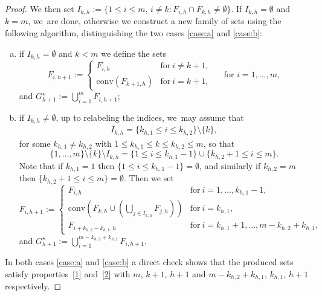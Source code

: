 \documentclass[JEP,XML,SOM,Unicode, NoFloatCountersInSection,published]{cedram}
\theoremstyle{definition}
\begin{document}
\begin{proof}
We then set $I_{k,h}:=\{1\le i\le m,\,i\ne k\colon F_{i,h}\cap F_{k,h}\ne\emptyset\}$.
If $I_{k,h}=\emptyset$ and $k=m$, we~are done, otherwise we
construct a new family of sets using the following algorithm, distinguishing the two cases \ref{case:a} and \ref{case:b}:
\begin{enumerate}[(a),wide]
\item\label{case:a} if $I_{k,h}=\emptyset$ and $k<m$
we define the sets
\begin{equation*}
F_{i,h+1}:=\begin{cases}
F_{i,h}& \text{for}\ i\neq{k+1},\\
\mathrm{conv}(F_{k+1,h})&\text{for}\ i=k+1,
\end{cases}\quad \text{ for }i=1,\dots,m,
\end{equation*}
and $
G_{h+1}^\star:=\bigcup_{i=1}^mF_{i,h+1}$;
\item\label{case:b}
if $I_{k,h}\ne\emptyset$,
up to relabeling the indices, we~may assume that
\begin{align*}
I_{k,h}=\{k_{h,1}\le i\le k_{h,2}\}\setminus\{k\},
\end{align*}
for some $k_{h,1}\ne k_{h,2}$ with $1\leq k_{h,1}\le k\le k_{h,2}\leq m$,
so that
\[
\{1,\dots,m\}\setminus\{k\}\setminus I_{k,h}=\{1\le i\le k_{h,1}-1\}\cup\{k_{h,2}+1\le i\le m\}.
\]
Note that if $k_{h,1}=1$ then $\{1\le i\le k_{h,1}-1\}=\emptyset$, and similarly if $k_{h,2}=m$ then $\{k_{h,2}+1\le i\le m\}=\emptyset$.
Then we set
\begin{equation*}
F_{i,h+1}:= \begin{cases}
F_{i,h}& \text{for}\ i=1,\dots,k_{h,1}-1,\\
\mathrm{conv}(F_{k,h}\cup(\bigcup_{j\in I_{k,h}}F_{j,h}))& \text{for}\ i=k_{h,1},\\
F_{i+k_{h,2}-k_{h,1},h}& \text{for}\ i=k_{h,1}+1,\dots, m-k_{h,2}+k_{h,1},
\end{cases}
\end{equation*}
and $G_{h+1}^\star:=\bigcup_{i=1}^{m-k_{h,2}+k_{h,1}}F_{i,h+1}$.
\end{enumerate}
In both cases \ref{case:a} and \ref{case:b} a direct check shows that the produced sets satisfy properties~\ref{1} and~\ref{2} with $m$, $k+1$, $h+1$ and $m-k_{h,2}+k_{h,1}$, $k_{h,1}$, $h+1$ respectively.


\end{proof}
\end{document}
